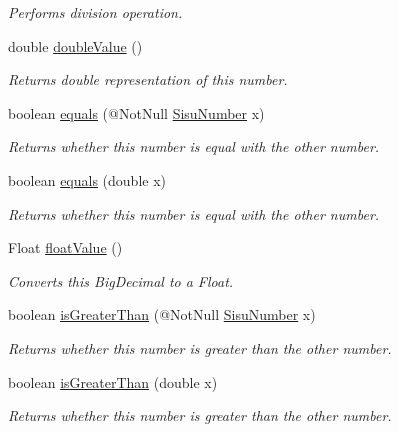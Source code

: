 \begin{DoxyCompactItemize}
\begin{DoxyCompactList}\small\item\em Performs division operation. \end{DoxyCompactList}\item 
double \hyperlink{classcom_1_1aarrelaakso_1_1drawl_1_1_sisu_number_a2ec0d89a34f60f2283ea189a1ae951c1}{double\+Value} ()
\begin{DoxyCompactList}\small\item\em Returns double representation of this number. \end{DoxyCompactList}\item 
boolean \hyperlink{classcom_1_1aarrelaakso_1_1drawl_1_1_sisu_number_a5558247d5f5682c75de31d798b801f59}{equals} (@Not\+Null \hyperlink{classcom_1_1aarrelaakso_1_1drawl_1_1_sisu_number}{Sisu\+Number} x)
\begin{DoxyCompactList}\small\item\em Returns whether this number is equal with the other number. \end{DoxyCompactList}\item 
boolean \hyperlink{classcom_1_1aarrelaakso_1_1drawl_1_1_sisu_number_a96f08f16d1a09dbbf49bd8cf59cc6c41}{equals} (double x)
\begin{DoxyCompactList}\small\item\em Returns whether this number is equal with the other number. \end{DoxyCompactList}\item 
Float \hyperlink{classcom_1_1aarrelaakso_1_1drawl_1_1_sisu_number_a4c7db66d6d3016a3d10a1664b43117b9}{float\+Value} ()
\begin{DoxyCompactList}\small\item\em Converts this Big\+Decimal to a Float. \end{DoxyCompactList}\item 
boolean \hyperlink{classcom_1_1aarrelaakso_1_1drawl_1_1_sisu_number_a1dee9c5cbc2371d7de70378298db017e}{is\+Greater\+Than} (@Not\+Null \hyperlink{classcom_1_1aarrelaakso_1_1drawl_1_1_sisu_number}{Sisu\+Number} x)
\begin{DoxyCompactList}\small\item\em Returns whether this number is greater than the other number. \end{DoxyCompactList}\item 
boolean \hyperlink{classcom_1_1aarrelaakso_1_1drawl_1_1_sisu_number_a41d3809a0fea924d08dcc1a14f866665}{is\+Greater\+Than} (double x)
\begin{DoxyCompactList}\small\item\em Returns whether this number is greater than the other number. \end{DoxyCompactList}\item 

\end{DoxyCompactItemize}
